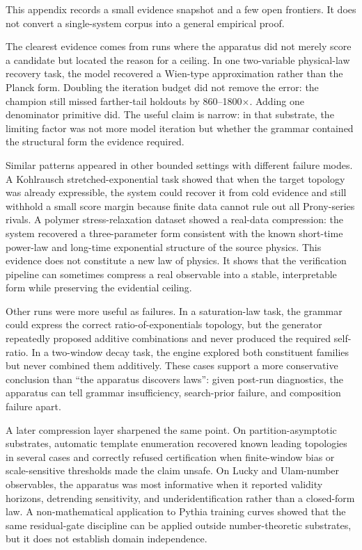 \documentclass[
  11pt,
]{article}
\begin{document}
This appendix records a small evidence snapshot and a few open frontiers.
It does not convert a single-system corpus into a general empirical proof.

The clearest evidence comes from runs where the apparatus did not merely
score a candidate but located the reason for a ceiling. In one
two-variable physical-law recovery task, the model recovered a Wien-type
approximation rather than the Planck form. Doubling the iteration budget
did not remove the error: the champion still missed farther-tail holdouts
by 860--1800\(\times\). Adding one denominator primitive did. The useful
claim is narrow: in that substrate, the limiting factor was not more
model iteration but whether the grammar contained the structural form the
evidence required.

Similar patterns appeared in other bounded settings with different
failure modes. A Kohlrausch stretched-exponential task showed that when
the target topology was already expressible, the system could recover it
from cold evidence and still withhold a small score margin because
finite data cannot rule out all Prony-series rivals. A polymer
stress-relaxation dataset showed a real-data compression: the system
recovered a three-parameter form consistent with the known short-time
power-law and long-time exponential structure of the source physics.
This evidence does not constitute a new law of physics. It shows that
the verification pipeline can sometimes compress a real observable into
a stable, interpretable form while preserving the evidential ceiling.

Other runs were more useful as failures. In a saturation-law task, the
grammar could express the correct ratio-of-exponentials topology, but
the generator repeatedly proposed additive combinations and never
produced the required self-ratio. In a two-window decay task, the
engine explored both constituent families but never combined them
additively. These cases support a more conservative conclusion than
``the apparatus discovers laws'': given post-run diagnostics, the
apparatus can tell grammar insufficiency, search-prior failure, and
composition failure apart.

A later compression layer sharpened the same point. On
partition-asymptotic substrates, automatic template enumeration
recovered known leading topologies in several cases and correctly
refused certification when finite-window bias or scale-sensitive
thresholds made the claim unsafe. On Lucky and Ulam-number observables,
the apparatus was most informative when it reported validity horizons,
detrending sensitivity, and underidentification rather than a
closed-form law. A non-mathematical application to Pythia training
curves showed that the same residual-gate discipline can be applied
outside number-theoretic substrates, but it does not establish domain
independence.
\end{document}
